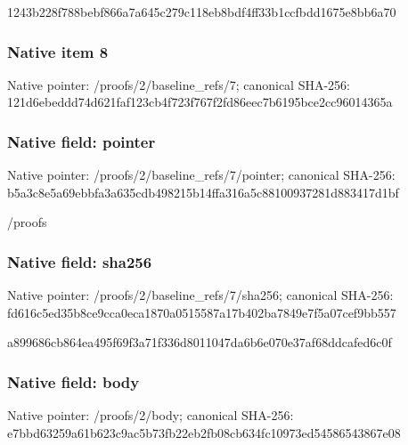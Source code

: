 \documentclass[10pt,a4paper]{article}
\begin{document}
1243b228f788bebf866a7a64\allowbreak{}5c279c118eb8bdf4ff33b1cc\allowbreak{}fbdd1675e8bb6a70


\subsubsection{Native item 8}


Native pointer: /proofs/2/baseline\_refs/7; canonical SHA-256: 121d6ebeddd74d621faf123c\allowbreak{}b4f723f767f2fd86eec7b619\allowbreak{}5bce2cc96014365a



\subsubsection{Native field: pointer}


Native pointer: /proofs/2/baseline\_refs/7/pointer; canonical SHA-256: b5a3c8e5a69ebbfa3a635cdb\allowbreak{}498215b14ffa316a5c881009\allowbreak{}37281d883417d1bf


/proofs


\subsubsection{Native field: sha256}


Native pointer: /proofs/2/baseline\_refs/7/sha256; canonical SHA-256: fd616c5ed35b8ce9cca0eca1\allowbreak{}870a0515587a17b402ba7849\allowbreak{}e7f5a07cef9bb557


a899686cb864ea495f69f3a7\allowbreak{}1f336d8011047da6b6e070e3\allowbreak{}7af68ddcafed6c0f


\subsubsection{Native field: body}


Native pointer: /proofs/2/body; canonical SHA-256: e7bbd63259a61b623c9ac5b7\allowbreak{}3fb22eb2fb08cb634fc10973\allowbreak{}ed54586543867e08
\end{document}
